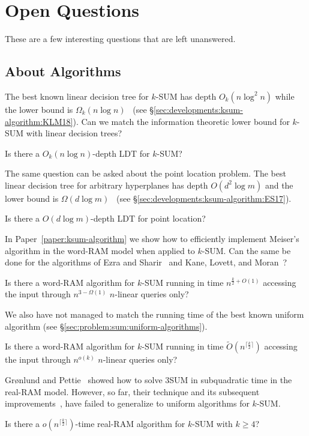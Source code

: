 \chapter{Open Questions}

These are a few interesting questions that are left unanswered.

\section{About Algorithms}

The best known linear decision tree for \(k\)-SUM has depth \(O_k(n \log^2 n)\) while
the lower bound is \(\Omega_k(n \log n)\)~\cite{KLM18}
(see \S\ref{sec:developments:ksum-algorithm:KLM18}).
Can we match the information theoretic lower bound for \(k\)-SUM with linear
decision trees?
\begin{openquestion}
Is there a \(O_k(n \log n)\)-depth LDT for \(k\)-SUM?
\end{openquestion}

The same question can be asked about the point location problem. The best
linear decision tree for arbitrary hyperplanes has depth \(O(d^2 \log m)\)
and the lower bound is \(\Omega(d \log m)\)~\cite{ES17}
(see \S\ref{sec:developments:ksum-algorithm:ES17}).
\begin{openquestion}
Is there a \(O(d \log m)\)-depth LDT for point location?
\end{openquestion}

In Paper~\ref{paper:ksum-algorithm}
we show how to efficiently implement Meiser's algorithm in the word-RAM model
when applied to \(k\)-SUM. Can the same be done for the algorithms of Ezra and
Sharir~\cite{ES17} and Kane, Lovett, and Moran~\cite{KLM18}?
\begin{openquestion}
Is there a word-RAM algorithm for \(k\)-SUM
running in time \(n^{\frac{k}{2}+O(1)}\)
accessing the input through \(n^{3 - \Omega(1)}\) \(n\)-linear queries only?
\end{openquestion}

We also have not managed to match the running time of the best known uniform
algorithm (see \S\ref{sec:problem:sum:uniform-algorithms}).
\begin{openquestion}
Is there a word-RAM algorithm for \(k\)-SUM
running in time \( \tilde{O}(n^{\lceil \frac k2 \rceil})\)
accessing the input through \(n^{o(k)}\) \(n\)-linear queries only?
\end{openquestion}

Gr\o nlund and Pettie~\cite{GP18}
showed how to solve 3SUM in subquadratic time in the real-RAM model.
However, so far, their technique and its subsequent
improvements~\cite{Fr15,GS15,Ch18}, have failed to generalize to uniform algorithms
for \(k\)-SUM.
\begin{openquestion}
	Is there a \(o(n^{\lceil \frac k2 \rceil})\)-time real-RAM algorithm for
	\(k\)-SUM with \(k \geq 4\)?
\end{openquestion}

